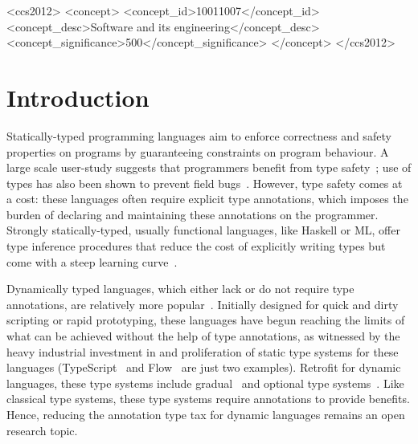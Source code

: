 \documentclass[acmsmall,nonacm]{acmart}\settopmatter{printfolios=true,printccs=false,printacmref=false}
\begin{document}
\begin{CCSXML}
<ccs2012>
<concept>
<concept_id>10011007</concept_id>
<concept_desc>Software and its engineering</concept_desc>
<concept_significance>500</concept_significance>
</concept>
</ccs2012>
\end{CCSXML}




\maketitle

\section{Introduction}

Statically-typed programming languages aim to enforce correctness and safety properties
on programs by guaranteeing constraints on program behaviour.
A large scale user-study
suggests that programmers
benefit from type safety~\citep{hanenberg14}; use of types has also been
shown to prevent field bugs~\citep{gao17}.
However, type safety comes at a cost: these languages often require explicit type annotations,
which imposes the burden of declaring and maintaining these annotations on the programmer.
Strongly statically-typed, usually functional languages, like Haskell or ML,
offer type inference procedures that reduce
the cost of explicitly writing types but come with
a steep learning curve~\citep{tirronen15}.

Dynamically typed languages, which either lack or do not require type
annotations, are relatively more popular~\cite{meyerovich12}.  Initially
designed for quick and dirty scripting or rapid prototyping, these languages
have begun reaching the limits of what can be achieved without the help of type
annotations, as witnessed by the heavy industrial investment in and proliferation of static type systems for these languages (TypeScript~\cite{typescript} and Flow~\cite{flow} are just two
examples).
Retrofit for dynamic languages, these type systems include gradual~\cite{siek06}
and optional type systems~\citep{bracha2004pluggable}.  Like classical type systems, these type systems
require annotations to provide benefits.  Hence, reducing the annotation type tax
for dynamic languages remains an open research topic.
\end{document}
